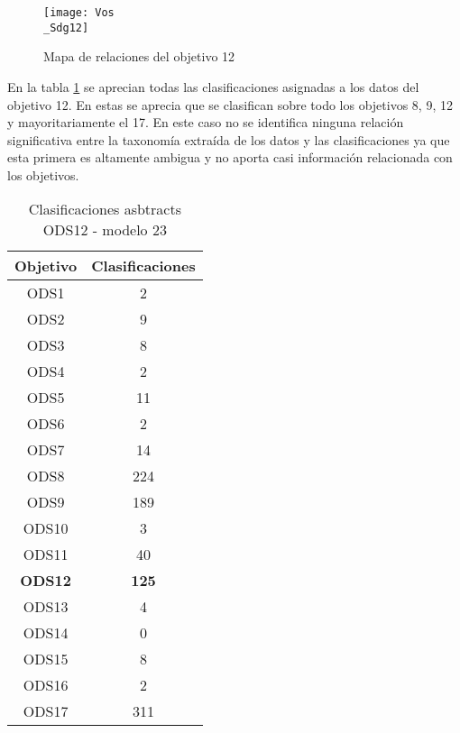 \begin{figure}[H]
    \centering
    \texttt{[image: Vos\\\_Sdg12]}
    \captionsetup{justification=centering}
    \caption{Mapa de relaciones del objetivo 12}
    \label{Mapa de relaciones del objetivo 12}
\end{figure}

En la tabla \cref{table:Clasificaciones asbtracts ODS12 - modelo 23} se aprecian
todas las clasificaciones asignadas a los datos del objetivo 12. En estas se
aprecia que se clasifican sobre todo los objetivos 8, 9, 12 y mayoritariamente
el 17. En este caso no se identifica ninguna relación significativa entre la
taxonomía extraída de los datos y las clasificaciones ya que esta primera es
altamente ambigua y no aporta casi información relacionada con los objetivos.
\begin{table}[H]
    \begin{tabular}{| c | c |}
        \hline
        Objetivo & Clasificaciones \\
        \hline \hline
        ODS1   & 2   \\ \hline
        ODS2   & 9   \\ \hline
        ODS3   & 8   \\ \hline
        ODS4   & 2   \\ \hline
        ODS5   & 11  \\ \hline
        ODS6   & 2   \\ \hline
        ODS7   & 14  \\ \hline
        ODS8   & 224 \\ \hline
        ODS9   & 189 \\ \hline
        ODS10  & 3   \\ \hline
        ODS11  & 40  \\ \hline
        \textbf{ODS12}  & \textbf{125} \\ \hline
        ODS13  & 4   \\ \hline
        ODS14  & 0   \\ \hline
        ODS15  & 8   \\ \hline
        ODS16  & 2   \\ \hline
        ODS17  & 311 \\ \hline
    \end{tabular}
    \caption{Clasificaciones asbtracts ODS12 - modelo 23}
    \label{table:Clasificaciones asbtracts ODS12 - modelo 23}
\end{table}


